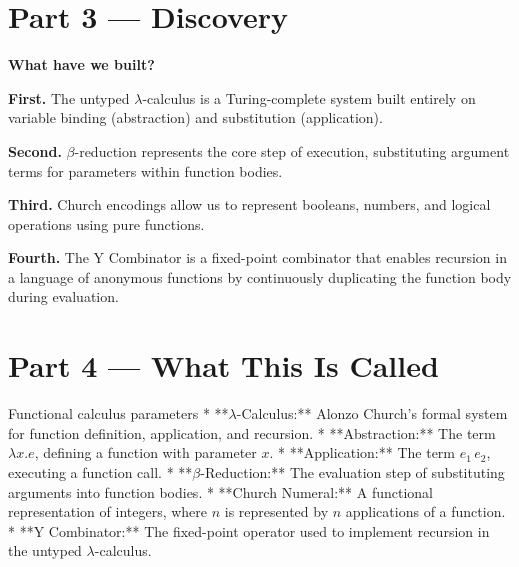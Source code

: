 \documentclass[12pt, a4paper]{book}
\begin{document}
\newpage

\section{Part 3 --- Discovery}

\begin{discoverybox}
\textbf{What have we built?}

\textbf{First.} The untyped $\lambda$-calculus is a Turing-complete system built entirely on variable binding (abstraction) and substitution (application).

\textbf{Second.} $\beta$-reduction represents the core step of execution, substituting argument terms for parameters within function bodies.

\textbf{Third.} Church encodings allow us to represent booleans, numbers, and logical operations using pure functions.

\textbf{Fourth.} The Y Combinator is a fixed-point combinator that enables recursion in a language of anonymous functions by continuously duplicating the function body during evaluation.
\end{discoverybox}

\newpage

\section{Part 4 --- What This Is Called}

\begin{namedconcept}{Functional calculus parameters}
* **$\lambda$-Calculus:** Alonzo Church's formal system for function definition, application, and recursion.
* **Abstraction:** The term $\lambda x. e$, defining a function with parameter $x$.
* **Application:** The term $e_1 \, e_2$, executing a function call.
* **$\beta$-Reduction:** The evaluation step of substituting arguments into function bodies.
* **Church Numeral:** A functional representation of integers, where $n$ is represented by $n$ applications of a function.
* **Y Combinator:** The fixed-point operator used to implement recursion in the untyped $\lambda$-calculus.
\end{namedconcept}

\newpage

\end{document}
